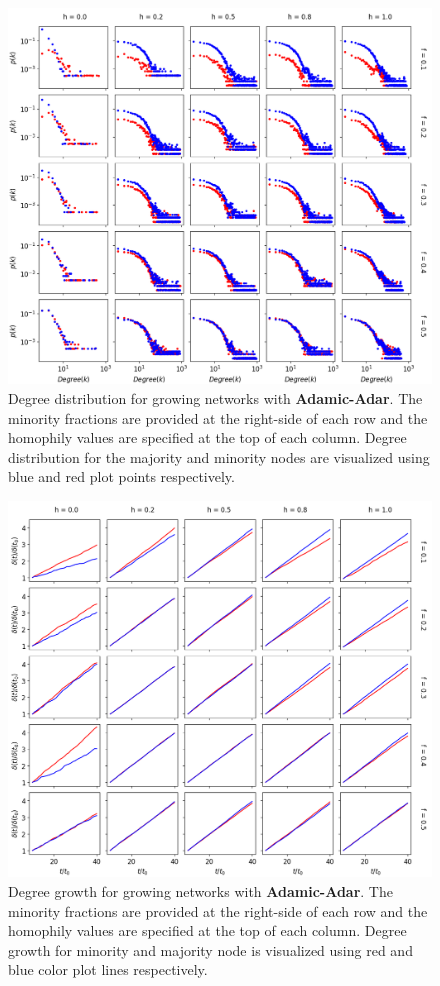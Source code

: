 \begin{figure}[h!]
	\centering
	\includegraphics[width=1.0\textwidth]{images/dd_growth_aa.png}
	\caption{Degree distribution for growing networks with \textbf{Adamic-Adar}. The minority fractions are provided at the right-side of each row and the homophily values are specified at the top of each column.  Degree distribution for the majority and minority nodes are visualized using blue and red plot points respectively.}
	\label{dd_growth_aa_fig}
\end{figure}

\begin{figure}[h!]
	\centering
	\includegraphics[width=1.0\textwidth]{images/dg_growth_aa.png}
	\caption{Degree growth for growing networks with \textbf{Adamic-Adar}. The minority fractions are provided at the right-side of each row and the homophily values are specified at the top of each column. Degree growth for minority and majority node is visualized using red and blue color plot lines respectively.}
	\label{dg_growth_aa_fig}
\end{figure}

